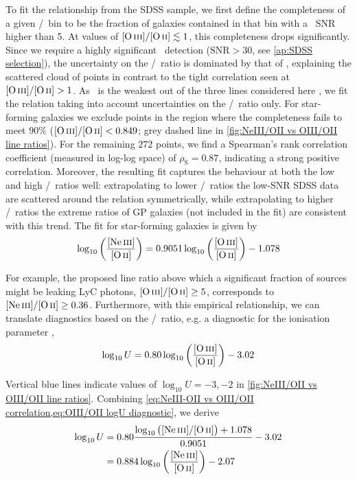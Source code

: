 To fit the relationship from the SDSS sample, we first define the completeness of a given \OIIIf/\OII\ bin to be the fraction of galaxies contained in that bin with a \NeIII\ SNR higher than 5. At values of $\OIIIf/\OII \lesssim 1$, this completeness drops significantly. Since we require a highly significant \OII\ detection ($\text{SNR} > 30$, see \cref{ap:SDSS selection}), the uncertainty on the \NeIII/\OII\ ratio is dominated by that of \NeIII, explaining the scattered cloud of points in contrast to the tight correlation seen at $\OIIIf/\OII > 1$. As \NeIII\ is the weakest out of the three lines considered here \citep{2019A&ARv..27....3M}, we fit the relation taking into account uncertainties on the \NeIII/\OII\ ratio only. For star-forming galaxies we exclude points in the region where the completeness fails to meet $90\%$ ($\OIIIf/\OII < 0.849$; grey dashed line in \cref{fig:NeIII/OII vs OIII/OII line ratios}). For the remaining $272$ points, we find a Spearman's rank correlation coefficient (measured in log-log space) of $\rho_\text{S} = 0.87$, indicating a strong positive correlation. Moreover, the resulting fit captures the behaviour at both the low and high \OIIIf/\OII\ ratios well: extrapolating to lower \OIIIf/\OII\ ratios the low-SNR SDSS data are scattered around the relation symmetrically, while extrapolating to higher \OIIIf/\OII\ ratios the extreme ratios of GP galaxies (not included in the fit) are consistent with this trend. The fit for star-forming galaxies is given by
\begin{equation}
    \label{eq:NeIII-OII vs OIII/OII correlation}
    \log_{10} \left( \frac{\NeIII}{\OII} \right) = 0.9051 \log_{10} \left( \frac{\OIIIf}{\OII} \right) - 1.078
\end{equation}

For example, the proposed line ratio above which a significant fraction of sources might be leaking LyC photons, $\OIIIf/\OII \geq 5$, \citep[e.g.][]{2016Natur.529..178I, 2016MNRAS.461.3683I} corresponds to $\NeIII/\OII \geq 0.36$. Furthermore, with this empirical relationship, we can translate diagnostics based on the \OIIIf/\OII\ ratio, e.g. a diagnostic for the ionisation parameter \citep[derived from single-star photoionisation models, see][]{2000MNRAS.318..462D},
\begin{equation}
    \label{eq:OIII/OII logU diagnostic}
    \log_{10} U = 0.80 \log_{10} \left( \frac{\OIIIf}{\OII} \right) - 3.02
\end{equation}

\noindent Vertical blue lines indicate values of $\log_{10} U = -3, -2$ in \cref{fig:NeIII/OII vs OIII/OII line ratios}. Combining \cref{eq:NeIII-OII vs OIII/OII correlation,eq:OIII/OII logU diagnostic}, we derive
\begin{align}
    \label{eq:NeIII/OII logU diagnostic}
    \log_{10} U & = 0.80 \frac{\log_{10} \left( \NeIII/\OII \right) + 1.078}{0.9051} - 3.02 \nonumber
    \\
    & = 0.884 \log_{10} \left( \frac{\NeIII}{\OII} \right) - 2.07
\end{align}

